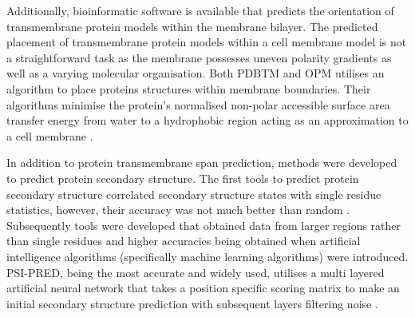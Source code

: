 Additionally, bioinformatic software is available that predicts the orientation of transmembrane protein models within the membrane bilayer.  The predicted placement of transmembrane protein models within a cell membrane model is not a straightforward task as the membrane possesses uneven polarity gradients as well as a varying molecular organisation.  Both PDBTM \cite{Kozma2012} and OPM \cite{Lomize2012} utilises an algorithm to place proteins structures within membrane boundaries.  Their algorithms minimise the protein's normalised non-polar accessible surface area transfer energy from water to a hydrophobic region acting as an approximation to a cell membrane \cite{Lomize2012,Kozma2012}.

In addition to protein transmembrane span prediction, methods were developed to predict protein secondary structure. The first tools to predict protein secondary structure correlated secondary structure states with single residue statistics, however, their accuracy was not much better than random \cite{rost2000third}.  Subsequently tools were developed that obtained data from larger regions rather than single residues and higher accuracies being obtained when artificial intelligence algorithms (specifically machine learning algorithms)  were introduced.  PSI-PRED, being the most accurate and widely used, utilises a multi layered artificial neural network that takes a position specific scoring matrix to make an initial secondary structure prediction with subsequent layers filtering noise \cite{buchan2019psipred}.

